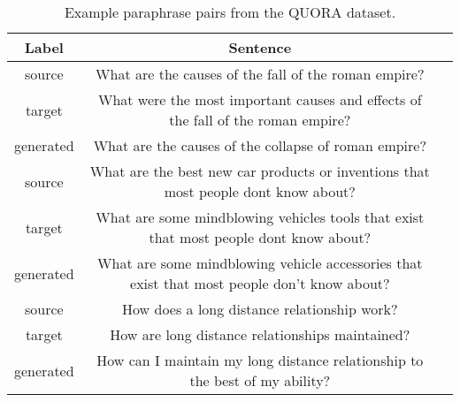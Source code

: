 \begin{table}
\small
\begin{adjustbox}{width=1.2\textwidth,center=\textwidth} 
 \begin{tabular}{|c c c|} 
 \hline
 Label & Sentence & \\ [0.5ex] 
 \hline
 source & What are the causes of the fall of the roman empire? &  \\
 \hline
 target & What were the most important causes and effects of the fall of the roman empire? &  \\
 \hline
 generated & What are the causes of the collapse of roman empire? & \\
 \hline
 source & What are the best new car products or inventions that most people dont know about? &  \\
 \hline
 target & What are some mindblowing vehicles tools that exist that most people dont know about? & \\
 \hline
 generated & What are some mindblowing vehicle accessories that exist that most people don't know about? &  \\
 \hline
 source & How does a long distance relationship work? &  \\
 \hline
 target & How are long distance relationships maintained? &  \\
 \hline
 generated & How can I maintain my long distance relationship to the best of my ability? &  \\
 \hline
\end{tabular}
\end{adjustbox}
\caption{Example paraphrase pairs from the QUORA dataset.}
\end{table}


